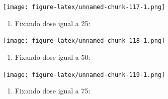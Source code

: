 \documentclass[
]{article}
\newenvironment{Shaded}{\begin{snugshade}}{\end{snugshade}}
\newcommand{\DataTypeTok}[1]{\textcolor[rgb]{0.13,0.29,0.53}{#1}}
\newcommand{\DecValTok}[1]{\textcolor[rgb]{0.00,0.00,0.81}{#1}}
\newcommand{\KeywordTok}[1]{\textcolor[rgb]{0.13,0.29,0.53}{\textbf{#1}}}
\newcommand{\NormalTok}[1]{#1}
\newcommand{\OperatorTok}[1]{\textcolor[rgb]{0.81,0.36,0.00}{\textbf{#1}}}
\newcommand{\StringTok}[1]{\textcolor[rgb]{0.31,0.60,0.02}{#1}}
\providecommand{\tightlist}{%
  \setlength{\itemsep}{0pt}\setlength{\parskip}{0pt}}
\begin{document}
\texttt{[image: figure-latex/unnamed-chunk-117-1.png]}

\begin{enumerate}
\def\labelenumi{\arabic{enumi}.}
\setcounter{enumi}{8}
\tightlist
\item
  Fixando dose igual a 25:
\end{enumerate}

\begin{Shaded}
\end{Shaded}

\texttt{[image: figure-latex/unnamed-chunk-118-1.png]}

\begin{enumerate}
\def\labelenumi{\arabic{enumi}.}
\setcounter{enumi}{9}
\tightlist
\item
  Fixando dose igual a 50:
\end{enumerate}

\begin{Shaded}
\end{Shaded}

\texttt{[image: figure-latex/unnamed-chunk-119-1.png]}

\begin{enumerate}
\def\labelenumi{\arabic{enumi}.}
\setcounter{enumi}{10}
\tightlist
\item
  Fixando dose igual a 75:
\end{enumerate}

\begin{Shaded}
\end{Shaded}
\end{document}
